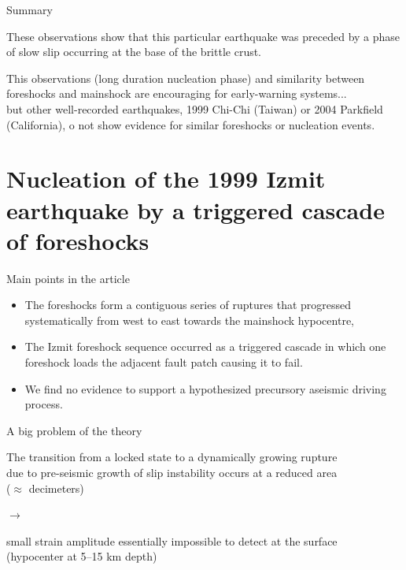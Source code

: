 \documentclass[aspectratio=43,9pt]{beamer}
\begin{document}
\begin{frame}{Summary}
 
 These observations show that this particular earthquake 
 was preceded by a phase of slow slip occurring at the 
 base of the brittle crust. \\
 \vskip 0.2cm

 This observations (long duration nucleation phase)
 and similarity between foreshocks and mainshock are encouraging
 for early-warning systems... \\
 \vskip 0.2cm
 but
 \vskip 0.2cm
 other well-recorded earthquakes, 1999 Chi-Chi (Taiwan) or 
 2004 Parkfield (California), o not show evidence for similar 
 foreshocks or nucleation events.
 \vfill
\end{frame}


\section{Nucleation of the 1999 Izmit earthquake by a triggered cascade of foreshocks}

\begin{frame}{Main points in the article}

\begin{itemize}
 \item The foreshocks form a contiguous series of ruptures that progressed
       systematically from west to east towards the mainshock hypocentre,
       \vskip 0.5cm
 \item The Izmit foreshock sequence occurred as a triggered cascade in which one foreshock loads the adjacent fault patch causing
       it to fail.
       \vskip 0.5cm
 \item We find no evidence to support a hypothesized
       precursory aseismic driving process.
\end{itemize}

\end{frame}


\begin{frame}{A big problem of the theory}
 
 \begin{minipage}{0.45\linewidth}
  The transition from a locked state to a dynamically growing rupture \\
  due to pre-seismic growth of slip instability occurs at a reduced area \\
  ($\approx$ decimeters)
 \end{minipage} $\longrightarrow$
 \begin{minipage}{0.45\linewidth}
  \centering
  small strain amplitude essentially impossible to detect at the surface \\ 
  (hypocenter at 5–15 km depth) 
 \end{minipage}
 \begin{minipage}{0.3\linewidth}
  
 \end{minipage}
 
\end{frame}
\end{document}

